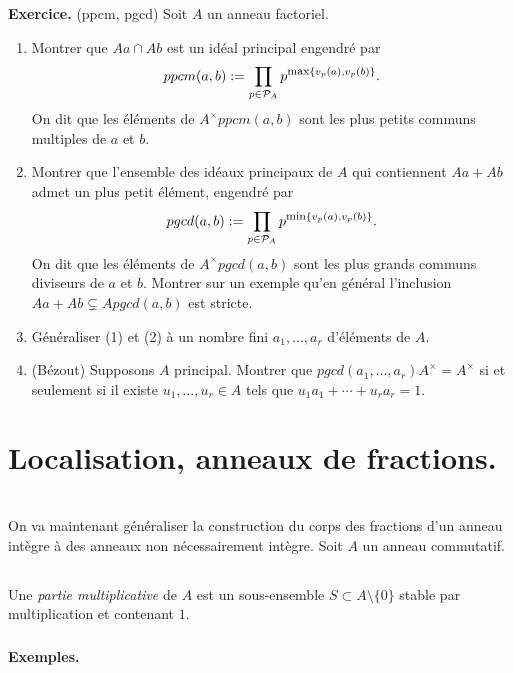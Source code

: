 \documentclass[a4paper, 12pt]{amsart}
\begin{document}
\subsubsection{}\noindent\textbf{Exercice.} (ppcm, pgcd) Soit $A$ un anneau factoriel. 
\begin{enumerate}
\item Montrer que $Aa\cap Ab$ est un id\'eal principal engendr\'e par 
$$ppcm(a, b):=\prod_{p\in\mathcal{P}_A}p^{\hbox{\rm \footnotesize max}\lbrace v_p(a),v_p(b)\rbrace}.$$
On dit que les \'el\'ements de $A^\times ppcm(a, b) $ sont les plus petits communs multiples de $a$ et $b$.
\item Montrer que l'ensemble des id\'eaux principaux de $A$ qui contiennent $Aa+ Ab$ admet un plus petit \'el\'ement, engendr\'e par
$$pgcd(a, b):=\prod_{p\in\mathcal{P}_A}p^{\hbox{\rm \footnotesize min}\lbrace v_p(a),v_p(b)\rbrace}.$$
On dit que les \'el\'ements de $A^\times pgcd(a, b) $ sont les plus grands communs diviseurs de $a$ et $b$. Montrer sur un exemple qu'en g\'en\'eral l'inclusion $Aa+Ab\subsetneq Apgcd(a,b)$ est stricte.
\item G\'en\'eraliser  (1) et (2) \`a un nombre fini $a_1,\dots, a_r$ d'\'el\'ements de $A$.
\item (B\'ezout) Supposons $A$ principal. Montrer que $pgcd(a_1,\dots, a_r)A^\times= A^\times$ si et seulement si il existe $u_1,\dots, u_r\in A$ tels que $u_1a_1+\cdots+u_ra_r=1$.
\end{enumerate}

 

 
\section{Localisation, anneaux de fractions.}\textit{}\\
\noindent On va maintenant g\'en\'eraliser la construction du corps des fractions d'un anneau int\`egre \`a des anneaux non n\'ecessairement int\`egre. Soit $A$ un anneau commutatif. 

\subsection{}Une \textit{partie multiplicative}   de $A$ est un sous-ensemble $S\subset A\setminus\lbrace 0\rbrace$ stable par multiplication et contenant $1$. \\

\subsubsection{}\label{LocEx1}\textbf{Exemples.}\\
\end{document}
